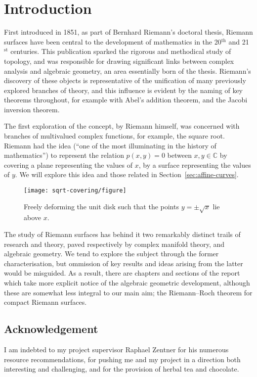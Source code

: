 \chapter*{Introduction}
First introduced in 1851, as part of Bernhard Riemann's doctoral
thesis, Riemann surfaces have been central
to the development of mathematics in the 20$^{\mathrm{t h}} $ and 21$
	^{\mathrm{s t}} $ centuries. This publication sparked the rigorous and
methodical study of topology, and was responsible for drawing significant links
between complex analysis and algebraic geometry, an area essentially born of the
thesis. Riemann's discovery of these objects is representative of the
unification of many previously explored branches of theory, and this influence
is evident by the naming of key theorems throughout, for example with Abel's
addition theorem, and the Jacobi inversion theorem.

The first exploration of the concept, by Riemann himself, was concerned with
branches of multivalued complex functions, for example, the square root. Riemann
had the idea (``one of the most illuminating in the history of
mathematics'') to represent the relation
$ p ( x,y )=0 $ between $ x,y \in \mathbb{C} $ by covering a plane representing
the values of $ x $, by a surface representing the values of $ y $. We will
explore this idea and those related in Section~\ref{sec:affine-curves}.

\begin{figure}[h]
	\centering
	\texttt{[image: sqrt-covering/figure]}
	\caption{Freely deforming the unit disk such that the points $ y = \pm\sqrt{x}
		$ lie above $ x $.}
\end{figure}

The study of Riemann surfaces has behind it two remarkably distinct trails of
research and theory, paved respectively by complex manifold theory, and
algebraic geometry. We tend to explore the subject through the former
characterisation, but ommission of key results and ideas arising from the latter
would be misguided. As a result, there are chapters and sections of the report
which take more explicit notice of the algebraic geometric development, although
these are somewhat less integral to our main aim; the Riemann--Roch theorem for
compact Riemann surfaces.

\section*{Acknowledgement}
I am indebted to my project supervisor Raphael Zentner for his numerous resource
recommendations, for pushing me and my project in a direction both interesting
and challenging, and for the provision of herbal tea and chocolate.

